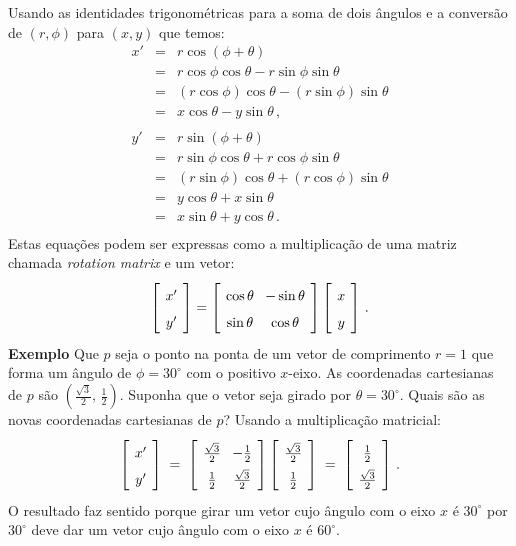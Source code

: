Usando as identidades trigonométricas para a soma de dois ângulos e a conversão de $(r,\phi)$ para $(x,y)$ que temos:
\begin{eqnarray*}
x' &=& r\cos(\phi+\theta)\\
&=&r\cos\phi\cos\theta - r\sin\phi\sin\theta\\
&=&(r\cos\phi)\cos\theta - (r\sin\phi)\sin\theta\\
&=&x\cos\theta - y\sin\theta\,,\\
\\
y' &=& r\sin(\phi+\theta)\\
&=&r\sin\phi\cos\theta + r\cos\phi\sin\theta\\
&=&(r\sin\phi)\cos\theta + (r\cos\phi)\sin\theta\\
&=&y\cos\theta + x\sin\theta\\
&=&x\sin\theta + y\cos\theta\,.\\
\end{eqnarray*}
Estas equações podem ser expressas como a multiplicação de uma matriz chamada \emph{rotation matrix} e um vetor:
\[
\spacearray
\left[\begin{array}{c}x'\\y'\end{array}\right]=
\left[\begin{array}{cc}\cos\theta&-\sin\theta\\\sin\theta&\cos\theta\end{array}\right]
\left[\begin{array}{c}x\\y\end{array}\right]\,.
\]
\noindent\textbf{Exemplo} Que $p$ seja o ponto na ponta de um vetor de comprimento $r=1$ que forma um ângulo de $\phi=30^{\circ}$ com o positivo $x$-eixo. As coordenadas cartesianas de $p$ são $\left(\frac{\sqrt{3}}{2},\,\frac{1}{2}\right)$. Suponha que o vetor seja girado por $\theta=30^{\circ}$. Quais são as novas coordenadas cartesianas de $p$? Usando a multiplicação matricial:
\[
\spacearray
\left[\begin{array}{c}x'\\y'\end{array}\right]\;=\;
\left[\begin{array}{cc}\frac{\sqrt{3}}{2}&-\frac{1}{2}\\\frac{1}{2}&\frac{\sqrt{3}}{2}\end{array}\right]
\left[\begin{array}{c}\frac{\sqrt{3}}{2}\\\frac{1}{2}\end{array}\right]\;=\;
\left[\begin{array}{c}\frac{1}{2}\\\frac{\sqrt{3}}{2}\end{array}\right]\,.
\]
O resultado faz sentido porque girar um vetor cujo ângulo com o eixo $x$ é $30^{\circ}$ por $30^{\circ}$ deve dar um vetor cujo ângulo com o eixo $x$ é $60^{\circ}$.

